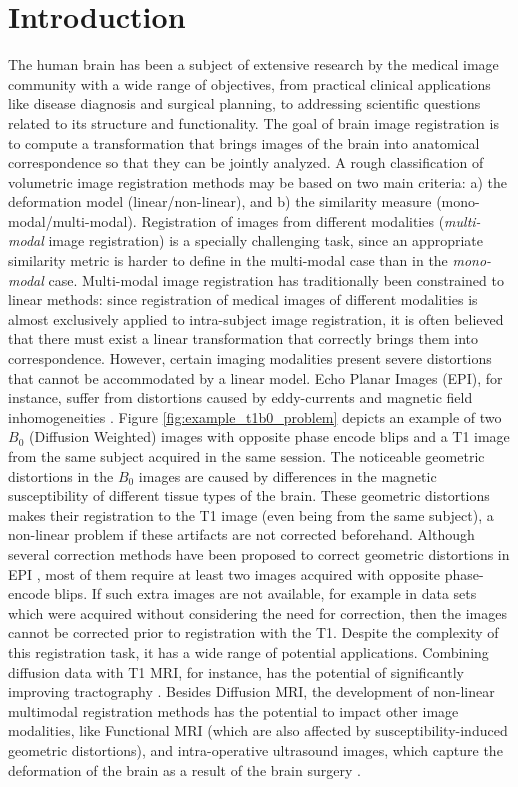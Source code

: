 \vspace{-0.5cm}
\section{Introduction}
The human brain has been a subject of extensive research by the medical image community with a wide range of objectives, from practical clinical applications like disease diagnosis and surgical planning, to addressing scientific questions related to its structure and functionality. The goal of brain image registration is to compute a transformation that brings images of the brain into anatomical correspondence so that they can be jointly analyzed. A rough classification of volumetric image registration methods may be based on two main criteria: a) the deformation model (linear/non-linear), and b) the similarity measure (mono-modal/multi-modal). Registration of images from different modalities (\emph{multi-modal} image registration) is a specially challenging task, since an appropriate similarity metric is harder to define in the multi-modal case than in the \emph{mono-modal} case. Multi-modal image registration has traditionally been constrained to linear methods: since registration of medical images of different modalities is almost exclusively applied to intra-subject image registration, it is often believed that there must exist a linear transformation that correctly brings them into correspondence. However, certain imaging modalities present severe distortions that cannot be accommodated by a linear model. Echo Planar Images (EPI), for instance, suffer from distortions caused by eddy-currents and magnetic field inhomogeneities \citep{Tournier2011, Andersson2003}. Figure \ref{fig:example_t1b0_problem} depicts an example of two $B_{0}$ (Diffusion Weighted) images with opposite phase encode blips and a T1 image from the same subject acquired in the same session. The noticeable geometric distortions in the $B_{0}$ images are caused by differences in the magnetic susceptibility of different tissue types of the brain. These geometric distortions makes their registration to the T1 image (even being from the same subject), a non-linear problem if these artifacts are not corrected beforehand. Although several correction methods have been proposed to correct geometric distortions in EPI \citep{Andersson2003, Holland2010, Ruthotto, Irfanoglu2014}, most of them require at least two images acquired with opposite phase-encode blips. If such extra images are not available, for example in data sets which were acquired without considering the need for correction, then the images cannot be corrected prior to registration with the T1. Despite the complexity of this registration task, it has a wide range of potential applications. Combining diffusion data with T1 MRI, for instance, has the potential of significantly improving tractography \citep{Smith2012, Girard2014}. Besides Diffusion MRI, the development of non-linear multimodal registration methods has the potential to impact other image modalities, like Functional MRI (which are also affected by susceptibility-induced geometric distortions), and intra-operative ultrasound images, which capture the deformation of the brain as a result of the brain surgery \citep{Rivaz2015, DeNigris2012}.
